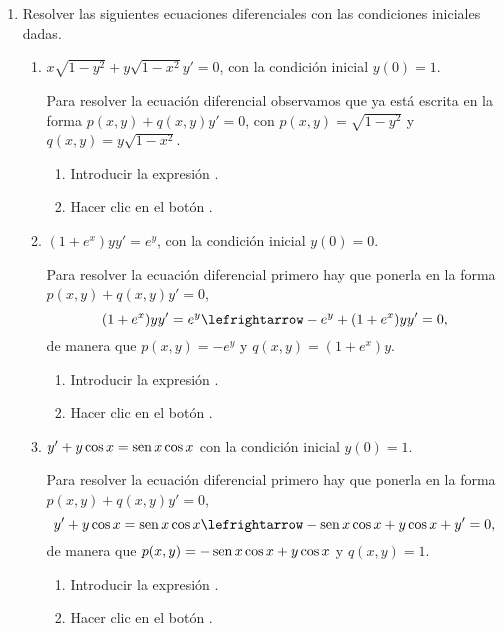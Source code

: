\begin{enumerate}[leftmargin=*]
\item Resolver las siguientes ecuaciones diferenciales con las condiciones iniciales dadas.
\begin{enumerate}
\item $x\sqrt{1-y^2}+y\sqrt{1-x^2} y'=0$, con la condición inicial $y(0)=1$.
\begin{indicacion}
{Para resolver la ecuación diferencial observamos que ya está escrita en la forma $p(x,y)+q(x,y)y'=0$, con
$p(x,y)=\sqrt{1-y^2}$ y $q(x,y)=y\sqrt{1-x^2}$.
\begin{enumerate}
\item Introducir la expresión .
\item Hacer clic en el botón .
\end{enumerate}
}
\end{indicacion}

\item $(1+e^x)yy'=e^y$, con la condición inicial $y(0)=0$.
\begin{indicacion}
{Para resolver la ecuación diferencial primero hay que ponerla en la forma $p(x,y)+q(x,y)y'=0$,
\[
(1+e^x)yy'=e^y \lefrightarrow -e^y+(1+e^x)yy'=0,
\]
de manera que $p(x,y)=-e^y$ y $q(x,y)=(1+e^x)y$.
\begin{enumerate}
\item Introducir la expresión .
\item Hacer clic en el botón .
\end{enumerate}
}
\end{indicacion}

\item $y'+y\cos x=\mathop{\rm sen}\nolimits x\cos x$ con la condición inicial $y(0)=1$.

\begin{indicacion}
{Para resolver la ecuación diferencial primero hay que ponerla en la forma $p(x,y)+q(x,y)y'=0$,
\[
y'+y\cos x=\sen x\cos x \lefrightarrow -\sen x\cos x+y\cos x+y'=0,
\]
de manera que $p(x,y)=-\mathop{\rm sen}\nolimits x\cos x+y\cos x$ y $q(x,y)=1$.
\begin{enumerate}
\item Introducir la expresión .
\item Hacer clic en el botón .
\end{enumerate}
}
\end{indicacion}
\end{enumerate}


\end{enumerate}
